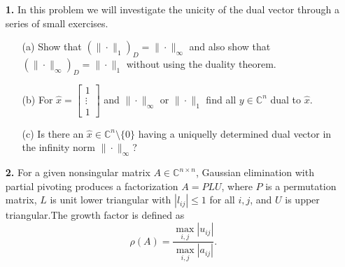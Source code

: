 \documentclass[10pt]{report}
\begin{document}
\begin{enumerate}
    
\item[\textbf{1.}] In this problem we will investigate the unicity of the dual vector through a series of small exercises.
  \begin{enumerate}
    \item[(a)] Show that $(\|\cdot\|_1)_D=\|\cdot\|_{\infty}$ and also show that
      $(\|\cdot\|_{\infty})_D=\|\cdot\|_{1}$ without using the duality theorem.

  \item[(b)] For $\hat{x}=\left[\begin{array}{c}1\\\vdots\\1\end{array}\right]$ and $\|\cdot\|_{\infty}$ or $\|\cdot\|_{1}$ find all $y\in\mathbb{C}^{n}$ dual to $\hat{x}$. 

    \item[(c)] Is there an $\hat{x}\in\mathbb{C}^{n}\setminus\{0\}$ having a uniquelly determined dual vector in the infinity norm $\|\cdot\|_{\infty}$?
  \end{enumerate}

\vspace{0.1cm} 

\item[\textbf{2.}] For a given nonsingular matrix $A\in\mathbb{C}^{n\times n}$, Gaussian elimination with partial pivoting produces a factorization $A=PLU$, where $P$ is a permutation matrix, $L$ is unit lower triangular with $|l_{ij}|\leq1$ for all $i,j$, and $U$ is upper triangular.The growth factor is defined as\[\rho(A)=\frac{\max_{i,j}|u_{ij}|}{\max_{i,j}|a_{ij}|}.\]


\end{enumerate}
\end{document}

